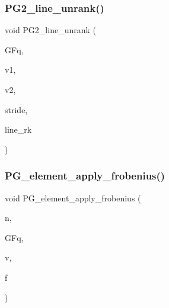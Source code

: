 \subsubsection{\texorpdfstring{P\+G2\+\_\+line\+\_\+unrank()}{PG2\_line\_unrank()}}
{\footnotesize\ttfamily void P\+G2\+\_\+line\+\_\+unrank (\begin{DoxyParamCaption}\item[{\mbox{\hyperlink{classfinite__field}{finite\+\_\+field}} \&}]{G\+Fq,  }\item[{\mbox{\hyperlink{galois_8h_a09fddde158a3a20bd2dcadb609de11dc}{I\+NT}} $\ast$}]{v1,  }\item[{\mbox{\hyperlink{galois_8h_a09fddde158a3a20bd2dcadb609de11dc}{I\+NT}} $\ast$}]{v2,  }\item[{\mbox{\hyperlink{galois_8h_a09fddde158a3a20bd2dcadb609de11dc}{I\+NT}}}]{stride,  }\item[{\mbox{\hyperlink{galois_8h_a09fddde158a3a20bd2dcadb609de11dc}{I\+NT}}}]{line\+\_\+rk }\end{DoxyParamCaption})}

\mbox{\label{projective_8_c_a4961a3ed7c7205cd78c1ef21730bec7c}} 
\subsubsection{\texorpdfstring{P\+G\+\_\+element\+\_\+apply\+\_\+frobenius()}{PG\_element\_apply\_frobenius()}}
{\footnotesize\ttfamily void P\+G\+\_\+element\+\_\+apply\+\_\+frobenius (\begin{DoxyParamCaption}\item[{\mbox{\hyperlink{galois_8h_a09fddde158a3a20bd2dcadb609de11dc}{I\+NT}}}]{n,  }\item[{\mbox{\hyperlink{classfinite__field}{finite\+\_\+field}} \&}]{G\+Fq,  }\item[{\mbox{\hyperlink{galois_8h_a09fddde158a3a20bd2dcadb609de11dc}{I\+NT}} $\ast$}]{v,  }\item[{\mbox{\hyperlink{galois_8h_a09fddde158a3a20bd2dcadb609de11dc}{I\+NT}}}]{f }\end{DoxyParamCaption})}

\mbox{\label{projective_8_c_a4bad103beeeeca7f0b9a2edb0d9d902c}} 
